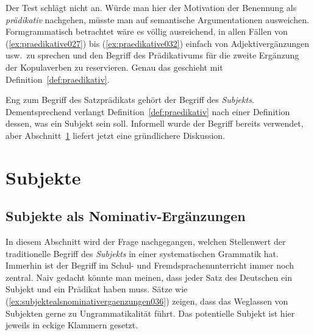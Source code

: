 Der Test schlägt nicht an.
Würde man hier der Motivation der Benennung als \textit{prädikativ} nachgehen, müsste man auf semantische Argumentationen ausweichen.
Formgrammatisch betrachtet wäre es völlig ausreichend, in allen Fällen von (\ref{ex:praedikative027}) bis (\ref{ex:praedikative032}) einfach von Adjektivergänzungen usw.\ zu sprechen und den Begriff des Prädikativums für die zweite Ergänzung der Kopulaverben zu reservieren.
Genau das geschieht mit Definition~\ref{def:praedikativ}.



Eng zum Begriff des Satzprädikats gehört der Begriff des \textit{Subjekts}.
Dementsprechend verlangt Definition~\ref{def:praedikativ} nach einer Definition dessen, was ein Subjekt sein soll.
Informell wurde der Begriff bereits verwendet, aber Abschnitt~\ref{sec:subjekte} liefert jetzt eine gründlichere Diskussion.



\section{Subjekte}
\label{sec:subjekte}

\subsection{Subjekte als Nominativ-Ergänzungen}
\label{sec:subjektealsnominativergaenzungen}


In diesem Abschnitt wird der Frage nachgegangen, welchen Stellenwert der traditionelle Begriff des \textit{Subjekts} in einer systematischen Grammatik hat.
Immerhin ist der Begriff im Schul- und Fremdsprachenunterricht immer noch zentral.
Naiv gedacht könnte man meinen, dass jeder Satz des Deutschen ein Subjekt und ein Prädikat haben muss.
Sätze wie (\ref{ex:subjektealsnominativergaenzungen036}) zeigen, dass das Weglassen von Subjekten gerne zu Ungrammatikalität führt.
Das potentielle Subjekt ist hier jeweils in eckige Klammern gesetzt.


